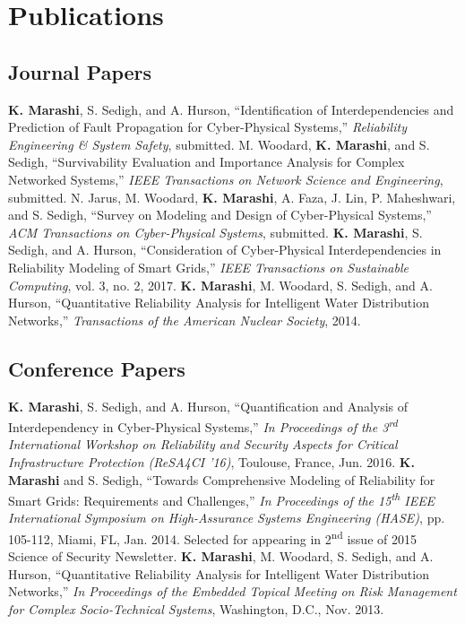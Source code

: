 \section{Publications}
\subsection{Journal Papers}
\begin{cvpubs}
  \cvpub
    {\textbf{K. Marashi}, S. Sedigh, and A. Hurson, ``Identification of Interdependencies and Prediction of Fault Propagation for Cyber-Physical Systems,'' \textit{Reliability Engineering \& System Safety}, submitted.}
  \cvpub
    {M. Woodard, \textbf{K. Marashi}, and S. Sedigh, ``Survivability Evaluation and Importance Analysis for Complex Networked Systems,'' \textit{IEEE Transactions on Network Science and Engineering}, submitted.}
  \cvpub
    {N. Jarus, M. Woodard, \textbf{K. Marashi}, A. Faza, J. Lin, P. Maheshwari, and S. Sedigh, ``Survey on Modeling and Design of Cyber-Physical Systems,'' \textit{ACM Transactions on Cyber-Physical Systems}, submitted.}
  \cvpub
    {\textbf{K. Marashi}, S. Sedigh, and A. Hurson, ``Consideration of Cyber-Physical Interdependencies in Reliability Modeling of Smart Grids,'' \textit{IEEE Transactions on Sustainable Computing}, vol. 3, no. 2, 2017.}
  \cvpub
    {\textbf{K. Marashi}, M. Woodard, S. Sedigh, and A. Hurson, ``Quantitative Reliability Analysis for Intelligent Water Distribution Networks,'' \textit{Transactions of the American Nuclear Society}, 2014.}
\end{cvpubs}

\subsection{Conference Papers}
\begin{cvpubs}
  \cvpub
    {\textbf{K. Marashi}, S. Sedigh, and A. Hurson, ``Quantification and Analysis of Interdependency in Cyber-Physical Systems,'' \textit{In Proceedings of the 3\textsuperscript{rd} International Workshop on Reliability and Security Aspects for Critical Infrastructure Protection (ReSA4CI '16)}, Toulouse, France, Jun. 2016.}
  \cvpub
    {\textbf{K. Marashi} and S. Sedigh, ``Towards Comprehensive Modeling of Reliability for Smart Grids: Requirements and Challenges,'' \textit{In Proceedings of the 15\textsuperscript{th} IEEE International Symposium on High-Assurance Systems Engineering (HASE)}, pp. 105-112, Miami, FL, Jan. 2014. Selected for appearing in 2\textsuperscript{nd} issue of 2015 Science of Security Newsletter.}
  \cvpub
    {\textbf{K. Marashi}, M. Woodard, S. Sedigh, and A. Hurson, ``Quantitative Reliability Analysis for Intelligent Water Distribution Networks,'' \textit{In Proceedings of the Embedded Topical Meeting on Risk Management for Complex Socio-Technical Systems}, Washington, D.C., Nov. 2013.}
\end{cvpubs}

